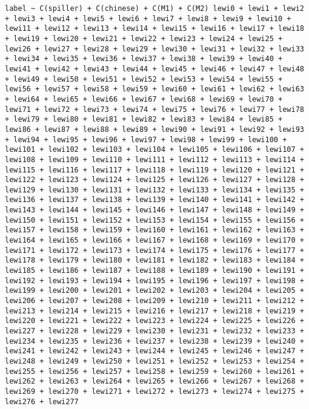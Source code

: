 \documentclass[12pt,fleqn]{article}\usepackage{../common}
\begin{document}
\begin{verbatim}
label ~ C(spiller) + C(chinese) + C(M1) + C(M2) lewi0 + lewi1 + lewi2 + lewi3 + lewi4 + lewi5 + lewi6 + lewi7 + lewi8 + lewi9 + lewi10 + lewi11 + lewi12 + lewi13 + lewi14 + lewi15 + lewi16 + lewi17 + lewi18 + lewi19 + lewi20 + lewi21 + lewi22 + lewi23 + lewi24 + lewi25 + lewi26 + lewi27 + lewi28 + lewi29 + lewi30 + lewi31 + lewi32 + lewi33 + lewi34 + lewi35 + lewi36 + lewi37 + lewi38 + lewi39 + lewi40 + lewi41 + lewi42 + lewi43 + lewi44 + lewi45 + lewi46 + lewi47 + lewi48 + lewi49 + lewi50 + lewi51 + lewi52 + lewi53 + lewi54 + lewi55 + lewi56 + lewi57 + lewi58 + lewi59 + lewi60 + lewi61 + lewi62 + lewi63 + lewi64 + lewi65 + lewi66 + lewi67 + lewi68 + lewi69 + lewi70 + lewi71 + lewi72 + lewi73 + lewi74 + lewi75 + lewi76 + lewi77 + lewi78 + lewi79 + lewi80 + lewi81 + lewi82 + lewi83 + lewi84 + lewi85 + lewi86 + lewi87 + lewi88 + lewi89 + lewi90 + lewi91 + lewi92 + lewi93 + lewi94 + lewi95 + lewi96 + lewi97 + lewi98 + lewi99 + lewi100 + lewi101 + lewi102 + lewi103 + lewi104 + lewi105 + lewi106 + lewi107 + lewi108 + lewi109 + lewi110 + lewi111 + lewi112 + lewi113 + lewi114 + lewi115 + lewi116 + lewi117 + lewi118 + lewi119 + lewi120 + lewi121 + lewi122 + lewi123 + lewi124 + lewi125 + lewi126 + lewi127 + lewi128 + lewi129 + lewi130 + lewi131 + lewi132 + lewi133 + lewi134 + lewi135 + lewi136 + lewi137 + lewi138 + lewi139 + lewi140 + lewi141 + lewi142 + lewi143 + lewi144 + lewi145 + lewi146 + lewi147 + lewi148 + lewi149 + lewi150 + lewi151 + lewi152 + lewi153 + lewi154 + lewi155 + lewi156 + lewi157 + lewi158 + lewi159 + lewi160 + lewi161 + lewi162 + lewi163 + lewi164 + lewi165 + lewi166 + lewi167 + lewi168 + lewi169 + lewi170 + lewi171 + lewi172 + lewi173 + lewi174 + lewi175 + lewi176 + lewi177 + lewi178 + lewi179 + lewi180 + lewi181 + lewi182 + lewi183 + lewi184 + lewi185 + lewi186 + lewi187 + lewi188 + lewi189 + lewi190 + lewi191 + lewi192 + lewi193 + lewi194 + lewi195 + lewi196 + lewi197 + lewi198 + lewi199 + lewi200 + lewi201 + lewi202 + lewi203 + lewi204 + lewi205 + lewi206 + lewi207 + lewi208 + lewi209 + lewi210 + lewi211 + lewi212 + lewi213 + lewi214 + lewi215 + lewi216 + lewi217 + lewi218 + lewi219 + lewi220 + lewi221 + lewi222 + lewi223 + lewi224 + lewi225 + lewi226 + lewi227 + lewi228 + lewi229 + lewi230 + lewi231 + lewi232 + lewi233 + lewi234 + lewi235 + lewi236 + lewi237 + lewi238 + lewi239 + lewi240 + lewi241 + lewi242 + lewi243 + lewi244 + lewi245 + lewi246 + lewi247 + lewi248 + lewi249 + lewi250 + lewi251 + lewi252 + lewi253 + lewi254 + lewi255 + lewi256 + lewi257 + lewi258 + lewi259 + lewi260 + lewi261 + lewi262 + lewi263 + lewi264 + lewi265 + lewi266 + lewi267 + lewi268 + lewi269 + lewi270 + lewi271 + lewi272 + lewi273 + lewi274 + lewi275 + lewi276 + lewi277
\end{verbatim}
\end{document}
